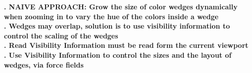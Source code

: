 \documentclass[review,journal]{vgtc}         %
\begin{document}
\textbf{. NAIVE APPROACH: Grow the size of color wedges dynamically when zooming in to vary the hue of the colors inside a wedge} \\


\textbf{. Wedges may overlap, solution is to use visibility information to control the scaling of the wedges} \\


\textbf{. Read Visibility Information must be read form the current viewport} \\


\textbf{. Use Visibility Information to control the sizes and the layout of wedges, via force fields} \\
\end{document}
